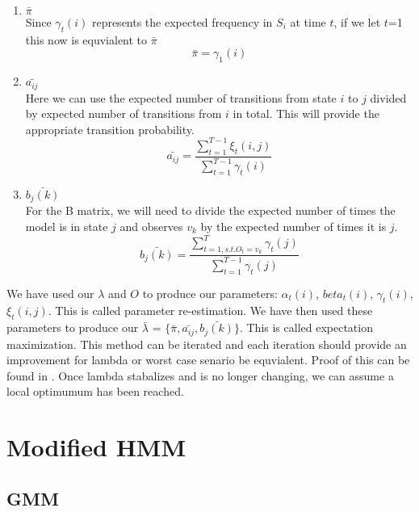 \begin{enumerate}[i]
    \item $\bar{\pi}$ \\
    Since $\gamma_t(i)$ represents the expected frequency in $S_i$ at time $t$, if we let $t$=1 this now is equvialent to $\bar{\pi}$ \\
    \begin{equation}
        \bar{\pi} = \gamma_1(i)
    \end{equation}

    \item $\bar{a_{ij}}$ \\
    Here we can use the expected number of transitions from state $i$ to $j$ divided by expected number of transitions from $i$ in total. This will provide the appropriate transition probability. \\
    \begin{equation}
        \bar{a_{ij}} = \dfrac{\sum_{t=1}^{T-1} \xi_t(i,j)}{\sum_{t=1}^{T-1} \gamma_t(i)}
    \end{equation}

    \item $\bar{b_j(k)}$ \\
    For the B matrix, we will need to divide the expected number of times the model is in state $j$ and observes $v_k$ by the expected number of times it is $j$.
    \begin{equation}
        \bar{b_j(k)} = \dfrac{\sum_{t=1, s.t. O_t = v_k}^T \gamma_t(j)}{\sum_{t=1}^{T-1} \gamma_t(j)}
    \end{equation} 
\end{enumerate}

We have used our $\lambda$ and $O$ to produce our parameters: $\alpha_t(i)$, $beta_t(i)$, $\gamma_t(i)$, $\xi_t(i,j)$. This is called parameter re-estimation. We have then used these parameters to produce our $\bar{\lambda}$ = $\{\bar{\pi}, \bar{a_{ij}}, \bar{b_j(k)} \}$. This is called expectation maximization. This method can be iterated and each iteration should provide an improvement for lambda or worst case senario be equvialent. Proof of this can be found in \cite{baum1972inequality}.  Once lambda stabalizes and is no longer changing, we can assume a local optimumum has been reached. 



\section{Modified HMM}
\subsection{GMM}




